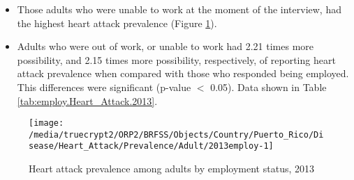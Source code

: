  
 \newpage
\begin{itemize}


\item Those adults who were 
unable to work at the moment of the interview, had the highest heart attack prevalence (Figure \ref{fig:employ.Heart_Attack.2013}).

\item Adults who were out of work, or unable to work had 2.21 times more possibility, and 2.15 times more possibility, respectively, of reporting heart attack prevalence when compared with those who responded being employed. This differences were significant (p-value $<$ 0.05). 
Data shown in Table \ref{tab:employ.Heart_Attack.2013}.


\end{itemize}

\begin{figure}[H]
\caption{Heart attack prevalence among adults by employment status, 
         2013}
\label{fig:employ.Heart_Attack.2013}
\begin{knitrout}
\color{fgcolor}

{\centering \texttt{[image: /media/truecrypt2/ORP2/BRFSS/Objects/Country/Puerto\_Rico/Disease/Heart\_Attack/Prevalence/Adult/2013employ-1]} 

}



\end{knitrout}
 \end{figure}

